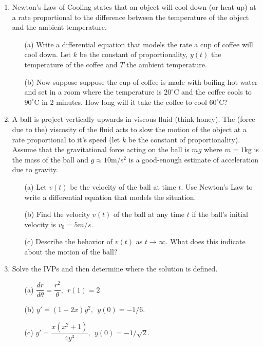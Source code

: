 \documentclass[12pt]{article}
\begin{document}
\begin{enumerate}
\item Newton's Law of Cooling states that an object will cool down (or heat up) at a rate proportional to the difference between the temperature of the object and the ambient temperature.  
\begin{itemize}
\item[(a)] Write a differential equation that models the rate a cup of coffee will cool down.  Let $k$ be the constant of proportionality, $y(t)$ the temperature of the coffee and $T$ the ambient temperature.
\item[(b)] Now suppose suppose the cup of coffee is made with boiling hot water and set in a room where the temperature is $20^{\circ}$C and the coffee cools to $90^{\circ}$C in 2 minutes.  How long will it take the coffee to cool $60^{\circ}$C?
\end{itemize}



\item A ball is project vertically upwards in viscous fluid (think honey).  The (force due to the) viscosity of the fluid acts to slow the motion of the object at a rate proportional to it's speed (let $k$ be the constant of proportionality).  Assume that the gravitational force acting on the ball is $mg$ where $m= 1$kg is the mass of the ball and $g\approx 10$m/s$^2$ is a good-enough estimate of acceleration due to gravity.
\begin{itemize}
\item[(a)] Let $v(t)$ be the velocity of the ball at time $t$.  Use Newton's Law to write a differential equation that models the situation.  
\item[(b)] Find the velocity $v(t)$ of the ball at any time $t$ if the ball's initial velocity is $v_0 = 5m/s$.
\item[(c)] Describe the behavior of $v(t)$ as $t\to \infty$.  What does this indicate about the motion of the ball?
\end{itemize}



\item Solve the IVPs and then determine where the solution is defined.
\begin{multicols}{2}
\begin{itemize}
\item[(a)] $\dfrac{dr}{d\theta} = \dfrac{r^2}{\theta}, \ \ r(1)=2$
\item[(b)] $y' = (1-2x)y^2, \ \ y(0) = -1/6.$
\item[(c)] $y' = \dfrac{x(x^2 + 1)}{4y^3}, \ \ y(0) = -1/\sqrt{2}.$
\end{itemize}
\end{multicols}




\end{enumerate}
\end{document}
